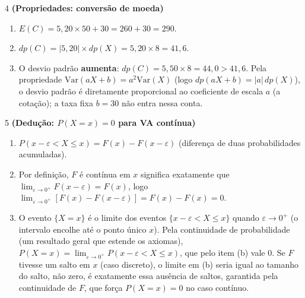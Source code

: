\documentclass[11pt]{article}
\begin{document}
\begin{questao}{4} \textbf{(Propriedades: conversão de moeda)}
\begin{solucao}
\begin{enumerate}[label=(\alph*)]
  \item $E(C) = 5{,}20\times50+30 = 260+30=290$.
  \item $dp(C) = |5{,}20|\times dp(X) = 5{,}20\times8=41{,}6$.
  \item O desvio padrão \textbf{aumenta}: $dp(C)=5{,}50\times8=44{,}0 > 41{,}6$. Pela propriedade
    $\mathrm{Var}(aX+b)=a^2\mathrm{Var}(X)$ (logo $dp(aX+b)=|a|\,dp(X)$), o desvio padrão é
    diretamente proporcional ao coeficiente de escala $a$ (a cotação); a taxa fixa $b=30$ não
    entra nessa conta.
\end{enumerate}
\end{solucao}
\end{questao}

\begin{questao}{5} \textbf{(Dedução: $P(X=x)=0$ para VA contínua)}
\begin{solucao}
\begin{enumerate}[label=(\alph*)]
  \item $P(x-\varepsilon<X\le x) = F(x) - F(x-\varepsilon)$ (diferença de duas probabilidades
    acumuladas).
  \item Por definição, $F$ é contínua em $x$ significa exatamente que
    $\lim_{\varepsilon\to0^+} F(x-\varepsilon) = F(x)$, logo
    $\lim_{\varepsilon\to0^+}[F(x)-F(x-\varepsilon)] = F(x)-F(x) = 0$.
  \item O evento $\{X=x\}$ é o limite dos eventos $\{x-\varepsilon<X\le x\}$ quando
    $\varepsilon\to0^+$ (o intervalo encolhe até o ponto único $x$). Pela continuidade de
    probabilidade (um resultado geral que estende os axiomas), $P(X=x) =
    \lim_{\varepsilon\to0^+} P(x-\varepsilon<X\le x)$, que pelo item (b) vale $0$. Se $F$ tivesse
    um salto em $x$ (caso discreto), o limite em (b) seria igual ao tamanho do salto, não zero,
    é exatamente essa ausência de saltos, garantida pela continuidade de $F$, que força
    $P(X=x)=0$ no caso contínuo.
\end{enumerate}
\end{solucao}
\end{questao}
\end{document}

